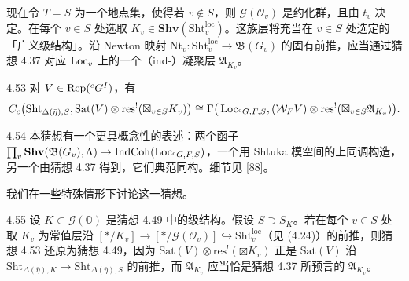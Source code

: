 现在令 $T=S$ 为一个地点集，使得若 $v\notin S$，则 $\mathcal G(\mathcal O_v)$ 是约化群，且由 $t_v$ 决定。在每个 $v\in S$ 处选取 $K_v\in\mathbf{Shv}(\mathrm{Sht}^{\mathrm{loc}}_v)$。这族层将充当在 $v\in S$ 处选定的「广义级结构」。沿 Newton 映射 $\mathrm{Nt}_v:\mathrm{Sht}^{\mathrm{loc}}_v\to\mathfrak B(G_v)$ 的固有前推，应当通过猜想 4.37 对应 $\operatorname{Loc}_v$ 上的一个（ind-）凝聚层 $\mathfrak A_{K_v}$。

\begin{conj}{4.53}\label{thm:a2-4-53}
对 $V\in\operatorname{Rep}({}^cG^I)$，有
\[
C_c\big(\mathrm{Sht}_{\Delta(\bar\eta),S},\mathrm{Sat}(V)\otimes\mathrm{res}^!(\boxtimes_{v\in S}K_v)\big)\cong\Gamma\big(\operatorname{Loc}_{{}^cG,F,S},(\mathcal W_FV)\otimes\mathrm{res}^!(\boxtimes_{v\in S}\mathfrak A_{K_v})\big).
\]
\end{conj}

\begin{rem}{4.54}\label{thm:a2-4-54}
本猜想有一个更具概念性的表述：两个函子 $\prod_v\mathbf{Shv}(\mathfrak B(G_v),\Lambda)\to\operatorname{IndCoh}(\operatorname{Loc}_{{}^cG,F,S})$，一个用 Shtuka 模空间的上同调构造，另一个由猜想 4.37 得到，它们典范同构。细节见 [88]。
\end{rem}

我们在一些特殊情形下讨论这一猜想。

\begin{exam}{4.55}\label{thm:a2-4-55}
设 $K\subset\mathcal G(\mathbb O)$ 是猜想 4.49 中的级结构。假设 $S\supset S_K$。若在每个 $v\in S$ 处取 $K_v$ 为常值层沿 $[*/K_v]\to[*/\mathcal G(\mathcal O_v)]\hookrightarrow\mathrm{Sht}^{\mathrm{loc}}_v$（见 (4.24)）的前推，则猜想 4.53 还原为猜想 4.49，因为 $\mathrm{Sat}(V)\otimes\mathrm{res}^!(\boxtimes K_v)$ 正是 $\mathrm{Sat}(V)$ 沿 $\mathrm{Sht}_{\Delta(\bar\eta),K}\to\mathrm{Sht}_{\Delta(\bar\eta),S}$ 的前推，而 $\mathfrak A_{K_v}$ 应当恰是猜想 4.37 所预言的 $\mathfrak A_{K_v}$。
\end{exam}

